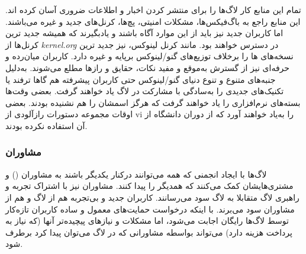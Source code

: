 تمام این منابع کار لاگ‌ها را برای منتشر کردن اخبار و اطلاعات
ضروری آسان کرده اند. این منابع راجع به باگ‌فیکس‌ها،
مشکلات امنیتی، پچ‌ها، کرنل‌های جدید و غیره می‌باشند.
اما کاربران جدید نیز باید از این موارد آگاه باشند
و یادبگیرند که همیشه جدید ترین کرنل‌ها از
\emph{kernel.org}
در دسترس خواهند بود. مانند کرنل لینوکس،
نیز جدید ترین نسخه‌های ‌ها را برخلاف
توزیع‌های گنو/لینوکس برپایه  و غیره دارد.
کاربران میان‌رده و حرفه‌ای نیز از گسترش به‌موقع و مفید
نکات، حقایق و رازها مطلع می‌شوند.
به‌دلیل جنبه‌های متنوع و تنوع دنیای گنو/لینوکس حتی
کاربران پیشرفته هم گاها ترفند یا تکنیک‌های جدیدی را
به‌سادگی با مشارکت در لاگ یاد خواهند گرفت.
بعضی وقت‌ها بسته‌های نرم‌افزاری را یاد خواهند گرفت که
هرگز اسمشان را هم نشنیده بودند. بعضی اوقات مجموعه دستورات
رازآلودی از {\ttfamily vi} را به‌یاد خواهند آورد که از دوران
دانشگاه از آن استفاده نکرده بودند.

\subsubsection{مشاوران }

لاگ‌ها با ایجاد انجمنی که همه می‌توانند درکنار یکدیگر باشند
به مشاوران
()
 و مشتری‌هایشان کمک می‌کنند که همدیگر را پیدا کنند.
مشاوران نیز با اشتراک تجربه و راهبری لاگ‌ متقابلا به لاگ سود می‌رسانند.
کاربران جدید و بی‌تجربه هم از لاگ و هم از مشاوران سود می‌برند.
با اینکه درخواست حمایت‌های معمول و ساده کاربران تازه‌کار توسط لاگ‌ها
رایگان اجابت می‌شود، اما مشکلات و نیازهای پیچیده‌تر آنها (که نیاز
به پرداخت هزینه دارد) می‌تواند بواسطه مشاورانی که در لاگ می‌توان پیدا
کرد برطرف شود.


